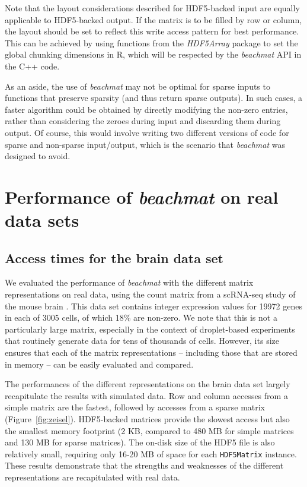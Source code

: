 \documentclass[10pt,letterpaper]{article}
\newcommand{\beachmat}{\textit{beachmat}}
\newcommand{\code}[1]{\texttt{#1}}
\begin{document}
Note that the layout considerations described for HDF5-backed input are equally applicable to HDF5-backed output.
If the matrix is to be filled by row or column, the layout should be set to reflect this write access pattern for best performance.
This can be achieved by using functions from the \textit{HDF5Array} package to set the global chunking dimensions in R, which will be respected by the \beachmat{} API in the C++ code.

As an aside, the use of \beachmat{} may not be optimal for sparse inputs to functions that preserve sparsity (and thus return sparse outputs).
In such cases, a faster algorithm could be obtained by directly modifying the non-zero entries, rather than considering the zeroes during input and discarding them during output.
Of course, this would involve writing two different versions of code for sparse and non-sparse input/output, which is the scenario that \beachmat{} was designed to avoid.

\section*{Performance of \beachmat{} on real data sets}

\subsection*{Access times for the brain data set}
We evaluated the performance of \beachmat{} with the different matrix representations on real data, using the count matrix from a scRNA-seq study of the mouse brain \cite{zeisel2015brain}.
This data set contains integer expression values for 19972 genes in each of 3005 cells, of which 18\% are non-zero.
We note that this is not a particularly large matrix, especially in the context of droplet-based experiments that routinely generate data for tens of thousands of cells.
However, its size ensures that each of the matrix representations -- including those that are stored in memory -- can be easily evaluated and compared.

The performances of the different representations on the brain data set largely recapitulate the results with simulated data.
Row and column accesses from a simple matrix are the fastest, followed by accesses from a sparse matrix (Figure~\ref{fig:zeisel}).
HDF5-backed matrices provide the slowest access but also the smallest memory footprint (2 KB, compared to 480 MB for simple matrices and 130 MB for sparse matrices).
The on-disk size of the HDF5 file is also relatively small, requiring only 16-20 MB of space for each \code{HDF5Matrix} instance. 
These results demonstrate that the strengths and weaknesses of the different representations are recapitulated with real data.
\end{document}
